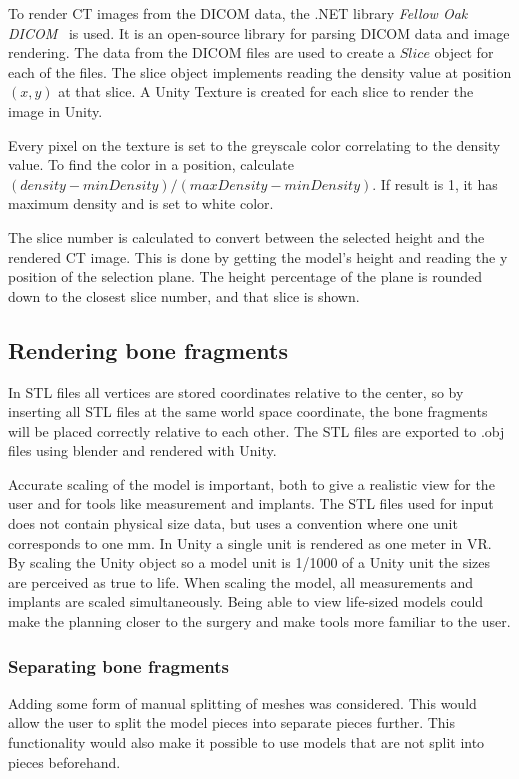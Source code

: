 \documentclass[a4paper]{report}
\begin{document}
To render CT images from the DICOM data, the .NET library \emph{Fellow Oak DICOM}~\cite{noauthor_fellow_2022} is used. It is an open-source library for parsing DICOM data and image rendering.
The data from the DICOM files are used to create a $Slice$ object for each of the files. The slice object implements reading the density value at position $(x, y)$ at that slice. A Unity Texture is created for each slice to render the image in Unity.

Every pixel on the texture is set to the greyscale color correlating to the density value. To find the color in a position, calculate $(density-minDensity)/(maxDensity-minDensity)$.
If result is 1, it has maximum density and is set to white color.


The slice number is calculated to convert between the selected height and the rendered CT image. This is done by getting the model's height and reading the y position of the selection plane. The height percentage of the plane is rounded down to the closest slice number, and that slice is shown.

\subsection{Rendering bone fragments}
In STL files all vertices are stored coordinates relative to the center, so by inserting all STL files at the same world space coordinate, the bone fragments will be placed correctly relative to each other. The STL files are exported to .obj files using blender and rendered with Unity.

Accurate scaling of the model is important, both to give a realistic view for the user and for tools like measurement and implants. The STL files used for input does not contain physical size data, but uses a convention where one unit corresponds to one mm. In Unity a single unit is rendered as one meter in VR. By scaling the Unity object so a model unit is 1/1000 of a Unity unit the sizes are perceived as true to life. When scaling the model, all measurements and implants are scaled simultaneously.
Being able to view life-sized models could make the planning closer to the surgery and make tools more familiar to the user.

\subsubsection{Separating bone fragments}
Adding some form of manual splitting of meshes was considered. This would allow the user to split the model pieces into separate pieces further. This functionality would also make it possible to use models that are not split into pieces beforehand.
\end{document}
